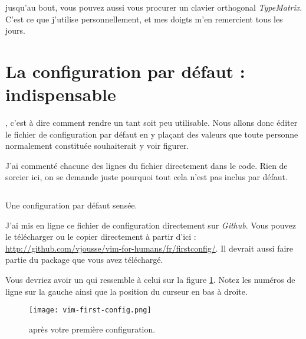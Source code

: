  jusqu'au bout, vous pouvez aussi vous procurer un clavier orthogonal \emph{TypeMatrix}. C'est ce que j'utilise personnellement, et mes doigts m'en remercient tous les jours.


\newpage
\section{La configuration par défaut : indispensable}

, c'est à dire comment rendre \vim un tant soit peu utilisable. Nous allons donc éditer le fichier de configuration par défaut \vimrc{} en y plaçant des valeurs que toute personne normalement constituée souhaiterait y voir figurer.

J'ai commenté chacune des lignes du fichier directement dans le code. Rien de sorcier ici, on se demande juste pourquoi tout cela n'est pas inclus par défaut.

\begin{listing}[H]
    \inputminted[bgcolor=bg, fontsize=\footnotesize]{vim}{../../vim-for-humans/firstconfig/vimrc}
    \caption{Une configuration par défaut sensée.}
    \label{code:first-config}
\end{listing}

J'ai mis en ligne ce fichier de configuration directement sur \emph{Github}. Vous pouvez le télécharger ou le copier directement à partir d'ici : \url{http://github.com/vjousse/vim-for-humans/fr/firstconfig/}. Il devrait aussi faire partie du package que vous avez téléchargé.

Vous devriez avoir un \vim qui ressemble à celui sur la figure \ref{fig:first-config}. Notez les numéros de ligne sur la gauche ainsi que la position du curseur en bas à droite.

\begin{figure}%
  \texttt{[image: vim-first-config.png]}
  \caption{\vim après votre première configuration.}
  \label{fig:first-config}
\end{figure}

